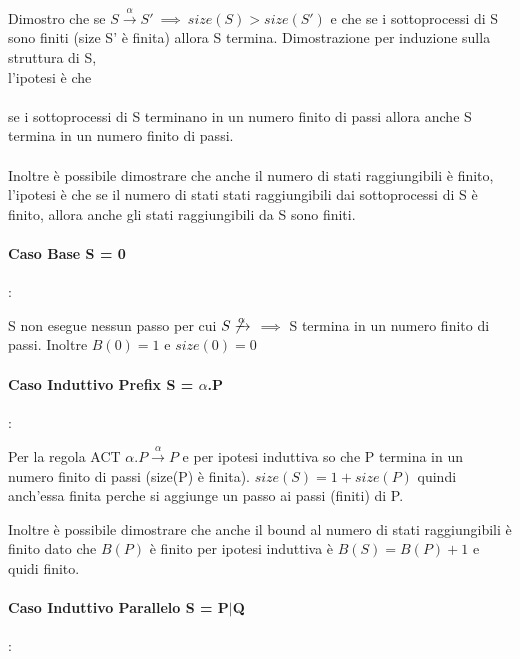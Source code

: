 \documentclass{article}
\newcommand{\passo}{\xrightarrow{\alpha}}
\begin{document}
Dimostro che se $ S \xrightarrow{\alpha}  S' ~ \implies ~ size(S) > size(S') $ e che se i sottoprocessi di S sono finiti (size S' è finita) allora S termina.
Dimostrazione per induzione sulla struttura di S, \\l'ipotesi è che\\\\ se i sottoprocessi di S terminano in un numero finito di passi allora anche S termina in un numero finito di passi.\\\\
Inoltre è possibile dimostrare che anche il numero di stati raggiungibili è finito, l'ipotesi è che se il numero di stati stati raggiungibili dai sottoprocessi di S è finito, allora anche gli stati raggiungibili da S sono finiti.

\paragraph{Caso Base S = 0}: 

S non esegue nessun passo per cui $S \not\passo$  $\implies$ S termina in un numero  finito di passi. Inoltre $B(0) = 1$ e $size(0) = 0$

\paragraph{Caso Induttivo Prefix S = $\alpha$.P}:

Per la regola ACT $\alpha.P \xrightarrow{\alpha}P$ e per ipotesi induttiva so che P termina in un numero finito di passi (size(P) è finita). $size(S) = 1+ size(P)$ quindi anch'essa finita perche si aggiunge un passo ai passi (finiti) di P.

Inoltre è possibile dimostrare che anche il bound al numero di stati raggiungibili è finito dato che $B(P)$ è finito per ipotesi induttiva è $B(S) = B(P)+1$ e quidi finito.

\paragraph{Caso Induttivo Parallelo S = P$|$Q}:
\end{document}
